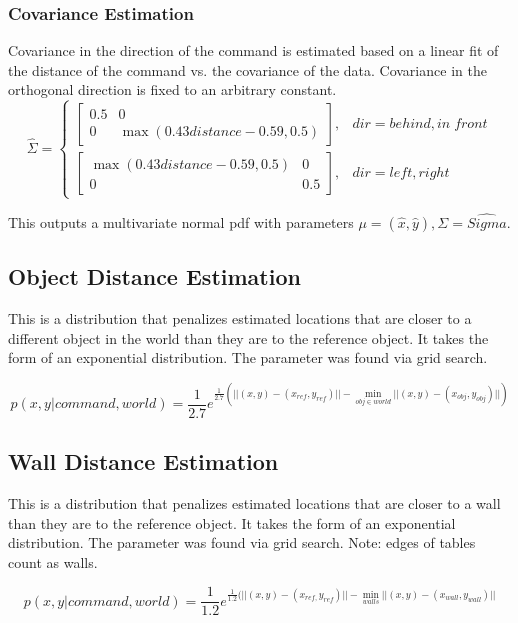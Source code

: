 \documentclass[12pt,letterpaper]{article}
\begin{document}
\subsubsection*{Covariance Estimation}
Covariance in the direction of the command is estimated based on a linear fit of the distance of the command vs. the covariance of the data. Covariance in the orthogonal direction is fixed to an arbitrary constant.
\[
\hat{\Sigma} = \begin{cases}
\begin{bmatrix} 0.5 & 0 \\ 0 & \max(0.43distance - 0.59, 0.5) \end{bmatrix}, & dir = behind, in\;front\\
\begin{bmatrix} \max(0.43distance - 0.59, 0.5) & 0 \\ 0 & 0.5 \end{bmatrix}, & dir = left, right
\end{cases}
\]

This outputs a multivariate normal pdf with parameters $\mu = (\hat{x}, \hat{y}), \Sigma = \hat{Sigma}$.

\subsection{Object Distance Estimation}
This is a distribution that penalizes estimated locations that are closer to a different object in the world than they are to the reference object. It takes the form of an exponential distribution. The parameter was found via grid search.

\[
p(x, y | command, world) = \frac{1}{2.7}e^{\frac{1}{2.7}(||(x, y) - (x_{ref}, y_{ref})|| - \min_{obj \in world} ||(x, y) - (x_{obj}, y_{obj})||)}
\]
\newpage
\subsection{Wall Distance Estimation}
This is a distribution that penalizes estimated locations that are closer to a wall than they are to the reference object. It takes the form of an exponential distribution. The parameter was found via grid search. Note: edges of tables count as walls.

\[
p(x, y | command, world) = \frac{1}{1.2}e^{\frac{1}{1.2}(||(x, y) - (x_{ref,} y_{ref})|| - \min_{walls} ||(x, y) - (x_{wall}, y_{wall})||}
\]
\end{document}
